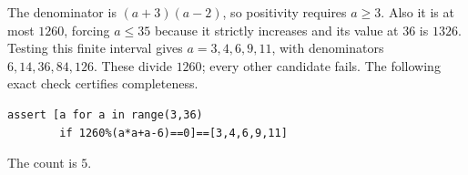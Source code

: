 The denominator is $(a+3)(a-2)$, so positivity requires $a\ge3$. Also it is at most $1260$, forcing $a\le35$ because it strictly increases and its value at $36$ is $1326$. Testing this finite interval gives $a=3,4,6,9,11$, with denominators $6,14,36,84,126$. These divide $1260$; every other candidate fails. The following exact check certifies completeness.\begin{verbatim}
assert [a for a in range(3,36)
        if 1260%(a*a+a-6)==0]==[3,4,6,9,11]
\end{verbatim}
The count is $\boxed5$.
